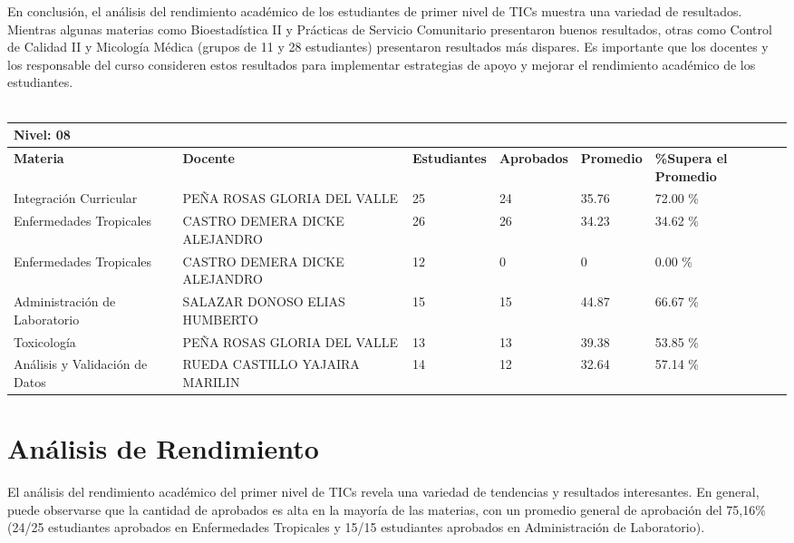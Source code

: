 En conclusión, el análisis del rendimiento académico de los estudiantes de primer nivel de TICs muestra una variedad de resultados. Mientras algunas materias como Bioestadística II y Prácticas de Servicio Comunitario presentaron buenos resultados, otras como Control de Calidad II y Micología Médica (grupos de 11 y 28 estudiantes) presentaron resultados más dispares. Es importante que los docentes y los responsable del curso consideren estos resultados para implementar estrategias de apoyo y mejorar el rendimiento académico de los estudiantes.\\
\vspace{1cm}\\\small
\begin{tabularx}{\textwidth}{|p{2.5cm}|p{2.5cm}|X|X|X|X|}
\hline
\multicolumn{6}{|X|}{\textbf{Nivel: 08 }}\\\hline\textbf{Materia} & \textbf{Docente} & \textbf{Estudiantes} & \textbf{Aprobados} & \textbf{Promedio} & \textbf{\%Supera el Promedio} \\ \hline
Integración Curricular & PEÑA ROSAS GLORIA DEL VALLE & 25 & 24 & 35.76 & 72.00 \%\\ \hline
Enfermedades Tropicales & CASTRO DEMERA DICKE ALEJANDRO & 26 & 26 & 34.23 & 34.62 \%\\ \hline
Enfermedades Tropicales & CASTRO DEMERA DICKE ALEJANDRO & 12 & 0 & 0 & 0.00 \%\\ \hline
Administración de Laboratorio & SALAZAR DONOSO ELIAS HUMBERTO & 15 & 15 & 44.87 & 66.67 \%\\ \hline
Toxicología & PEÑA ROSAS GLORIA DEL VALLE & 13 & 13 & 39.38 & 53.85 \%\\ \hline
Análisis y Validación de Datos & RUEDA CASTILLO YAJAIRA MARILIN & 14 & 12 & 32.64 & 57.14 \%\\ \hline
\end{tabularx}

\vspace{1cm}
\section{Análisis de Rendimiento}
El análisis del rendimiento académico del primer nivel de TICs revela una variedad de tendencias y resultados interesantes. En general, puede observarse que la cantidad de aprobados es alta en la mayoría de las materias, con un promedio general de aprobación del 75,16\% (24/25 estudiantes aprobados en Enfermedades Tropicales y 15/15 estudiantes aprobados en Administración de Laboratorio).

